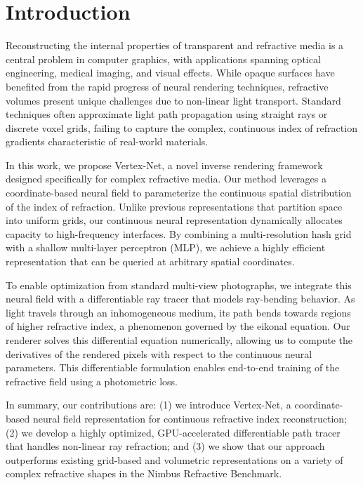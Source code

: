 \section{Introduction}
Reconstructing the internal properties of transparent and refractive media is a central problem in computer graphics, with applications spanning optical engineering, medical imaging, and visual effects. While opaque surfaces have benefited from the rapid progress of neural rendering techniques, refractive volumes present unique challenges due to non-linear light transport. Standard techniques often approximate light path propagation using straight rays or discrete voxel grids, failing to capture the complex, continuous index of refraction gradients characteristic of real-world materials.

In this work, we propose Vertex-Net, a novel inverse rendering framework designed specifically for complex refractive media. Our method leverages a coordinate-based neural field to parameterize the continuous spatial distribution of the index of refraction. Unlike previous representations that partition space into uniform grids, our continuous neural representation dynamically allocates capacity to high-frequency interfaces. By combining a multi-resolution hash grid with a shallow multi-layer perceptron (MLP), we achieve a highly efficient representation that can be queried at arbitrary spatial coordinates.

To enable optimization from standard multi-view photographs, we integrate this neural field with a differentiable ray tracer that models ray-bending behavior. As light travels through an inhomogeneous medium, its path bends towards regions of higher refractive index, a phenomenon governed by the eikonal equation. Our renderer solves this differential equation numerically, allowing us to compute the derivatives of the rendered pixels with respect to the continuous neural parameters. This differentiable formulation enables end-to-end training of the refractive field using a photometric loss.

In summary, our contributions are: (1) we introduce Vertex-Net, a coordinate-based neural field representation for continuous refractive index reconstruction; (2) we develop a highly optimized, GPU-accelerated differentiable path tracer that handles non-linear ray refraction; and (3) we show that our approach outperforms existing grid-based and volumetric representations on a variety of complex refractive shapes in the Nimbus Refractive Benchmark.
